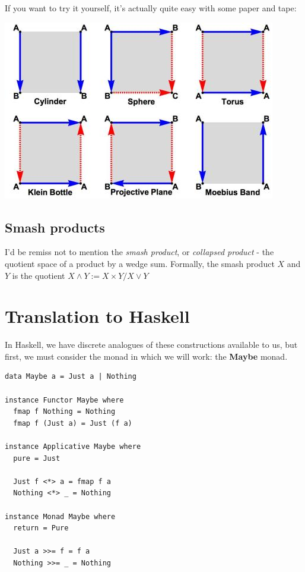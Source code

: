 \documentclass[tikz]{beamer}
\theoremstyle{definition}
\begin{document}
\frame
{
	If you want to try it yourself, it's actually quite easy with some paper and tape: 
	
	\begin{center}
		\includegraphics[scale=0.4]{identification_spaces}
	\end{center}
	 
}

\subsection{Smash products}
\frame
{
	I'd be remiss not to mention the \textit{smash product}, or \textit{collapsed product} - the quotient space of a product by a wedge sum. Formally, the smash product $X$ and $Y$ is the quotient $X \wedge Y := X \times Y / X \vee Y$
}

\section{Translation to Haskell}

\frame 
{
	In Haskell, we have discrete analogues of these constructions available to us, but first, we must consider the monad in which we will work: the \textbf{Maybe} monad. 

}

\begin{frame}[fragile]
	
	\begin{center}
		\begin{verbatim}
data Maybe a = Just a | Nothing
			
instance Functor Maybe where
  fmap f Nothing = Nothing
  fmap f (Just a) = Just (f a)
			  
instance Applicative Maybe where
  pure = Just
		  
  Just f <*> a = fmap f a
  Nothing <*> _ = Nothing
			  
instance Monad Maybe where
  return = Pure
  
  Just a >>= f = f a
  Nothing >>= _ = Nothing
\end{verbatim}
\end{center}
\end{frame}
\end{document}
